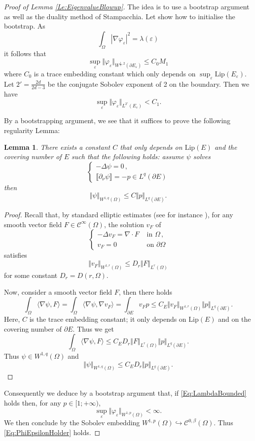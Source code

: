 \documentclass{article}
\renewcommand{\leq}{\leqslant}
\def\e{{\varepsilon}}
\newtheorem{lemma}[material]{Lemma}
\def\O{{\Omega}}
\def\n{{\nabla}}
\def\p{{\varphi}}
\numberwithin{equation}{section}
\begin{document}
\begin{proof}[Proof of Lemma \ref{Le:EigenvalueBlowup}]
The idea is to use a bootstrap argument as well as the duality method of Stampacchia. Let show how to initialise the bootstrap. As 
\[ \int_\O |\n \p_\e|^2=\lambda(\e)\] it follows that
\[ \sup_\e \Vert \p_\e\Vert_{W^{\frac12,2}(\partial E_\e)}\leq C_0 M_1\] where $C_0$ is a trace embedding constant which only depends on $\sup_\e \mathrm{Lip}(E_\e)$.  Let $2'=\frac{2d}{2d-3}$ be the conjugate Sobolev exponent of 2 on the boundary.  Then we have 
\[ \sup_\e \Vert \p_\e\Vert_{L^{2'}(E_\e)}<C_1.\]

By a bootstrapping argument, we see that it suffices to prove the following regularity Lemma:
\begin{lemma}There exists a constant $C$ that only depends on $\mathrm{Lip}(E)$ and the covering number of $E$ such that the following holds: assume  $\psi$ solves 
\[ \begin{cases}-\Delta \psi=0\,, 
\\ \llbracket \partial_\nu \psi\rrbracket=-p\in L^q(\partial E)\end{cases}\] then \[ \Vert \psi\Vert_{W^{1,q}(\O)}\leq  C\Vert p\Vert_{L^q(\partial E)}.\]
\end{lemma}
\begin{proof}
Recall that, by standard elliptic estimates (see for instance \cite[Theorem 1.1]{Amrouche2020}), for any smooth vector field $F\in \mathscr C^\infty(\O)$, the solution $v_F$ of 
\[
\begin{cases}-\Delta v_F=\nabla\cdot F&\text{ in }\O\,, 
\\ v_F=0&\text{ on }\partial \O\end{cases}\] satisfies 
\[ \Vert v_F\Vert_{W^{1,r}(\O)}\leq D_r\Vert F\Vert_{L^r(\O)}\] for some constant $D_r=D(r,\O)$.

Now, consider a smooth vector field $F$, then there holds 
\[ \int_\O \langle \n \psi,F\rangle=\int_\O \langle \n \psi,\n v_F\rangle=\int_{\partial E} v_F p\leq C_E\Vert v_F\Vert_{W^{1,r}(\O)}\Vert p\Vert_{L^q(\partial E)}.\] Here, $C$ is the trace embedding constant; it only depends on $\mathrm{Lip}(E)$ and on the covering number of $\partial E$. Thus we get
\[ \int_\O \langle \n \psi,F\rangle\leq C_ED_r\Vert F\Vert_{L^r(\O)}\Vert p\Vert_{L^q(\partial E)}.\]Thus $\psi\in W^{1,q}(\O)$ and 
\[ \Vert \psi\Vert_{W^{1,q}(\O)}\leq C_ED_r \Vert p\Vert_{L^q(\partial E)}.\]
\end{proof}
Consequently we deduce by a bootstrap argument that, if \eqref{Eq:LambdaBounded} holds then, for any $p\in [1;+\infty)$, 
\[ \sup_{\e}\Vert \p_\e\Vert_{W^{1,p}(\O)}<\infty.\] We then conclude by the Sobolev embedding $W^{1,p}(\O)\hookrightarrow \mathscr C^{0,\beta}(\O)$. Thus \eqref{Eq:PhiEpsilonHolder} holds.


\end{proof}
\end{document}
